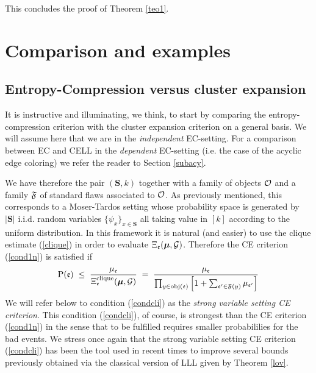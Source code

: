 \documentclass[11pt]{article}
\newcommand{\zeq}{\setcounter{equation}{0}}
\let\m=\mu \let\n=\nu \let\o=\omega    \let\p=\pi \let\ph=\varphi
\let\\=\noindent
\def\ee{\end{equation}}
\def\be{\begin{equation}}
\begin{document}
\\This concludes
the proof of Theorem \ref{teo1}.




\section{Comparison and examples}\label{appl}\zeq


\subsection{Entropy-Compression   versus cluster expansion}\label{compar}
It is instructive and illuminating, we think,  to  start by
comparing the entropy-compression criterion with the cluster expansion criterion on a general basis.
\\We will assume here that we are in the  {\it independent} EC-setting.
For a  comparison between EC and CELL in the {\it dependent}  EC-setting (i.e. the case of the acyclic edge coloring) we refer  the reader to Section \ref{subacy}.

\\We have therefore
the pair $(\mathbf{S},k)$  together with
a family of objects ${{\mathcal O}}$ and a  family ${\mathfrak{F}}$ of standard flaws associated to ${{\mathcal O}}$.
As previously mentioned, this  corresponds to a Moser-Tardos setting
whose  probability space is generated by $|\mathbf{S}|$ i.i.d.  random variables $\{\psi_x\}_{x\in \mathbf{S}}$
all taking value in $[k]$ according to the uniform distribution.
In this framework
it is natural (and easier) to use  the clique estimate   (\ref{clique}) in order to evaluate  $\Xi_\ev(\bm \m,\GG)$. Therefore the CE criterion
(\ref{cond1n}) is satisfied if
\be
\label{condcli}
\prob(\ev)\;\leq\;  {\mu_\ev \over\Xi^{\rm clique}_\ev(\bm \m,\GG)}\;=\; {\mu_\ev \over  \prod_{y\in \obj(\ev)}\Big[1+ \sum_{\ev'\in \fa(y)}\m_{\ev'}\Big]}
\ee
We  will refer  below to condition (\ref{condcli}) as the {\it strong variable setting CE criterion}.
This condition (\ref{condcli}), of course, is strongest than the CE criterion (\ref{cond1n}) in the sense that to be fulfilled
requires smaller probabililies for the bad events.
We stress once again that   the {strong variable setting CE criterion} (\ref{condcli})
 has been the tool used in recent times to improve several bounds previously obtained via the classical version of LLL given by Theorem \ref{lov}.
\end{document}
